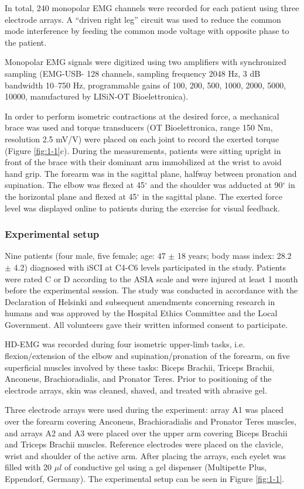In total, 240 monopolar EMG channels were recorded for each patient using three electrode arrays. A “driven right leg” circuit \citep{Merletti2004} was used to reduce the common mode interference by feeding the common mode voltage with opposite phase to the patient.

Monopolar EMG signals were digitized using two amplifiers with synchronized sampling (EMG-USB- 128 channels, sampling frequency 2048 Hz, 3 dB bandwidth 10–750 Hz, programmable gains of 100, 200, 500, 1000, 2000, 5000, 10000, manufactured by LISiN-OT Bioelettronica).

In order to perform isometric contractions at the desired force, a mechanical brace was used and torque transducers (OT Bioelettronica, range 150 Nm, resolution 2.5 mV/V) were placed on each joint to record the exerted torque (Figure \ref{fig:1-1}c). During the measurements, patients were sitting upright in front of the brace with their dominant arm immobilized at the wrist to avoid hand grip. The forearm was in the sagittal plane, halfway between pronation and supination. The elbow was flexed at 45$^{\circ}$ and the shoulder was adducted at 90$^{\circ}$ in the horizontal plane and flexed at 45$^{\circ}$ in the sagittal plane. The exerted force level was displayed online to patients during the exercise for visual feedback.

\subsubsection{Experimental setup}
Nine patients (four male, five female; age: 47 $\pm$ 18 years; body mass index: 28.2 $\pm$ 4.2) diagnosed with iSCI at C4-C6 levels participated in the study. Patients were rated C or D according to the ASIA scale and were injured at least 1 month before the experimental session. The study was conducted in accordance with the Declaration of Helsinki and subsequent amendments concerning research in humans and was approved by the Hospital Ethics Committee and the Local Government. All volunteers gave their written informed consent to participate.

HD-EMG was recorded during four isometric upper-limb tasks, i.e. flexion/extension of the elbow and supination/pronation of the forearm, on five superficial muscles involved by these tasks: Biceps Brachii, Triceps Brachii, Anconeus, Brachioradialis, and Pronator Teres. Prior to positioning of the electrode arrays, skin was cleaned, shaved, and treated with abrasive gel.

Three electrode arrays were used during the experiment: array A1 was placed over the forearm covering Anconeus, Brachioradialis and Pronator Teres muscles, and arrays A2 and A3 were placed over the upper arm covering Biceps Brachii and Triceps Brachii muscles. Reference electrodes were placed on the clavicle, wrist and shoulder of the active arm. After placing the arrays, each eyelet was filled with 20 $\mu l$ of conductive gel using a gel dispenser (Multipette Plus, Eppendorf, Germany). The experimental setup can be seen in Figure \ref{fig:1-1}.


